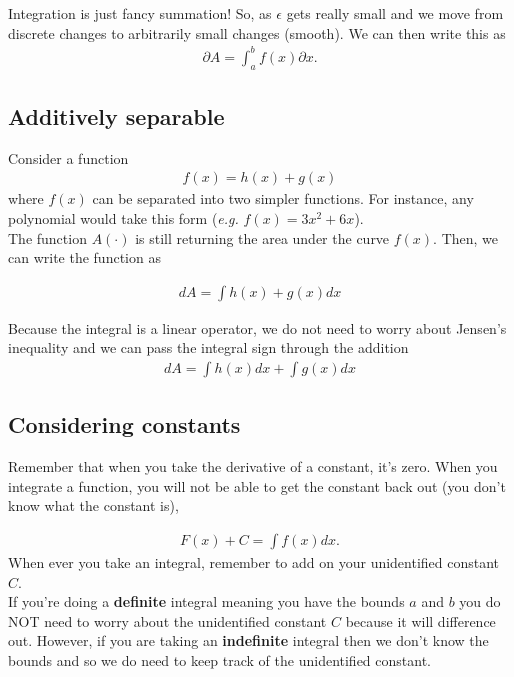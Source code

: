\documentclass{article}
\begin{document}
Integration is just fancy summation! So, as $\epsilon$ gets really small and we move from discrete changes to arbitrarily small changes (smooth). We can then write this as 
\begin{align}
    \partial A =  \int_{a}^{b} f(x) \partial x.
\end{align}

\subsection{Additively separable}
Consider a function 
\begin{align}
    f(x) = h(x) + g(x)
\end{align}
where $f(x)$ can be separated into two simpler functions. For instance, any polynomial would take this form (\textit{e.g.} $f(x) = 3x^2 + 6x$). \\

The function $A(\cdot)$ is still returning the area under the curve $f(x)$. Then, we can write the function as 

\begin{align}
    dA = \int h(x) + g(x) dx
\end{align}

Because the integral is a linear operator, we do not need to worry about Jensen's inequality and we can pass the integral sign through the addition 
\begin{align}
    dA = \int h(x) dx + \int g(x) dx
\end{align}

\subsection{Considering constants}
Remember that when you take the derivative of a constant, it's zero. When you integrate a function, you will not be able to get the constant back out (you don't know what the constant is),

\begin{align}
    F(x) + C = \int f(x) dx.
\end{align}
When ever you take an integral, remember to add on your unidentified constant $C$. \\

If you're doing a \textbf{definite} integral meaning you have the bounds $a$ and $b$ you do NOT need to worry about the unidentified constant $C$ because it will difference out. However, if you are taking an \textbf{indefinite} integral then we don't know the bounds and so we do need to keep track of the unidentified constant.\\
\end{document}
